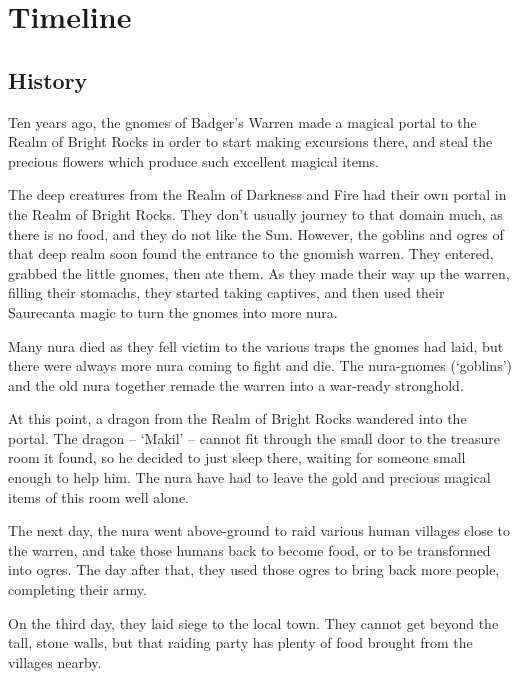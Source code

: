 \chapter{Timeline}

\section{History}

\begin{multicols}{2}

Ten years ago, the gnomes of Badger's Warren made a magical portal to the Realm of Bright Rocks in order to start making excursions there, and steal the precious flowers which produce such excellent magical items.

The deep creatures from the Realm of Darkness and Fire had their own portal in the Realm of Bright Rocks.
They don't usually journey to that domain much, as there is no food, and they do not like the Sun.
However, the goblins and ogres of that deep realm soon found the entrance to the gnomish warren.
They entered, grabbed the little gnomes, then ate them.
As they made their way up the warren, filling their stomachs, they started taking captives, and then used their Saurecanta magic to turn the gnomes into more nura.

Many nura died as they fell victim to the various traps the gnomes had laid, but there were always more nura coming to fight and die.
The nura-gnomes (`goblins') and the old nura together remade the warren into a war-ready stronghold.

At this point, a dragon from the Realm of Bright Rocks wandered into the portal.
The dragon -- `Makil' -- cannot fit through the small door to the treasure room it found, so he decided to just sleep there, waiting for someone small enough to help him.
The nura have had to leave the gold and precious magical items of this room well alone.

The next day, the nura went above-ground to raid various human villages close to the warren, and take those humans back to become food, or to be transformed into ogres.
The day after that, they used those ogres to bring back more people, completing their army.

On the third day, they laid siege to the local town.
They cannot get beyond the tall, stone walls, but that raiding party has plenty of food brought from the villages nearby.

\end{multicols}

